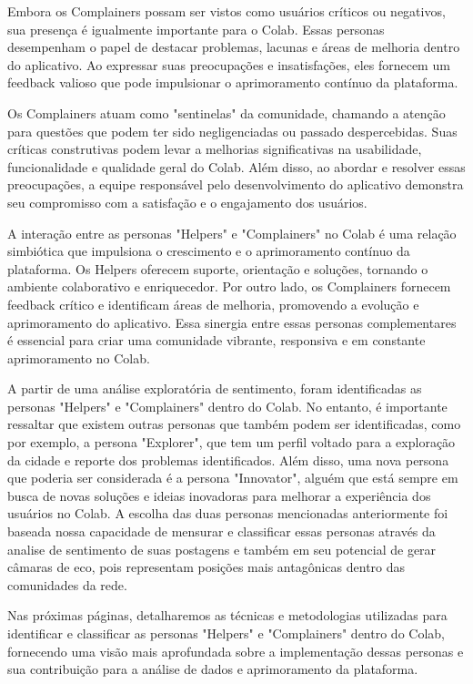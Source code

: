 Embora os Complainers possam ser vistos como usuários críticos ou negativos, sua presença é igualmente importante para o Colab. Essas personas desempenham o papel de destacar problemas, lacunas e áreas de melhoria dentro do aplicativo. Ao expressar suas preocupações e insatisfações, eles fornecem um feedback valioso que pode impulsionar o aprimoramento contínuo da plataforma.

Os Complainers atuam como "sentinelas" da comunidade, chamando a atenção para questões que podem ter sido negligenciadas ou passado despercebidas. Suas críticas construtivas podem levar a melhorias significativas na usabilidade, funcionalidade e qualidade geral do Colab. Além disso, ao abordar e resolver essas preocupações, a equipe responsável pelo desenvolvimento do aplicativo demonstra seu compromisso com a satisfação e o engajamento dos usuários.

A interação entre as personas "Helpers" e "Complainers" no Colab é uma relação simbiótica que impulsiona o crescimento e o aprimoramento contínuo da plataforma. Os Helpers oferecem suporte, orientação e soluções, tornando o ambiente colaborativo e enriquecedor. Por outro lado, os Complainers fornecem feedback crítico e identificam áreas de melhoria, promovendo a evolução e aprimoramento do aplicativo. Essa sinergia entre essas personas complementares é essencial para criar uma comunidade vibrante, responsiva e em constante aprimoramento no Colab.

A partir de uma análise exploratória de sentimento, foram identificadas as personas "Helpers" e "Complainers" dentro do Colab. No entanto, é importante ressaltar que existem outras personas que também podem ser identificadas, como por exemplo, a persona "Explorer", que tem um perfil voltado para a exploração da cidade e reporte dos problemas identificados. Além disso, uma nova persona que poderia ser considerada é a persona "Innovator", alguém que está sempre em busca de novas soluções e ideias inovadoras para melhorar a experiência dos usuários no Colab. A escolha das duas personas mencionadas anteriormente foi baseada nossa capacidade de mensurar e classificar essas personas através da analise de sentimento de suas postagens e também em seu potencial de gerar câmaras de eco, pois representam posições mais antagônicas dentro das comunidades da rede.

Nas próximas páginas, detalharemos as técnicas e metodologias utilizadas para identificar e classificar as personas "Helpers" e "Complainers" dentro do Colab, fornecendo uma visão mais aprofundada sobre a implementação dessas personas e sua contribuição para a análise de dados e aprimoramento da plataforma.

